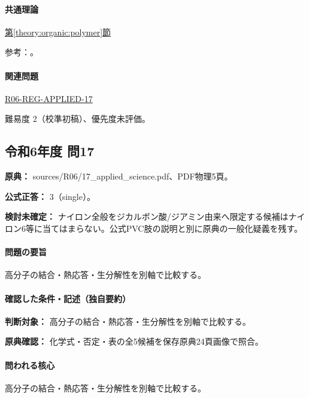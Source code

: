 \paragraph{共通理論} \hyperref[theory:organic:polymer]{第\ref*{theory:organic:polymer}節}

\par 参考：\cite{organic_physical,organic_step,organic_jbpa}。

\paragraph{関連問題} \hyperref[q:r06-reg-applied-17]{R06-REG-APPLIED-17}

\par 難易度 2（校準初稿）、優先度未評価。

\subsection{令和6年度 問17}
\label{q:r06-reg-applied-17}

\noindent\textbf{原典：} sources/R06/17\_applied\_science.pdf、PDF物理5頁。

\textbf{公式正答：} 3（single）。

\par\textbf{検討未確定：} ナイロン全般をジカルボン酸/ジアミン由来へ限定する候補はナイロン6等に当てはまらない。公式PVC肢の説明と別に原典の一般化疑義を残す。

\paragraph{問題の要旨} 高分子の結合・熱応答・生分解性を別軸で比較する。

\paragraph{確認した条件・記述（独自要約）}\mbox{}\par

\noindent\textbf{判断対象：} 高分子の結合・熱応答・生分解性を別軸で比較する。\par

\noindent\textbf{原典確認：} 化学式・否定・表の全5候補を保存原典24頁画像で照合。\par

\paragraph{問われる核心} 高分子の結合・熱応答・生分解性を別軸で比較する。

